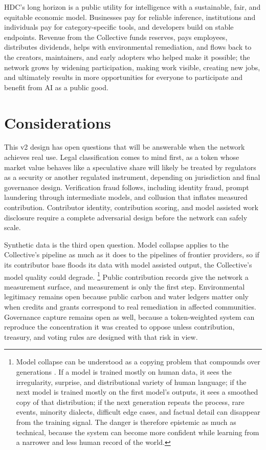 \documentclass[10pt,a4paper,twocolumn]{article}
\begin{document}
HDC's long horizon is a public utility for intelligence with a sustainable, fair, and equitable economic model. Businesses pay for reliable inference, institutions and individuals pay for category-specific tools, and developers build on stable endpoints. Revenue from the Collective funds reserves, pays employees, distributes dividends, helps with environmental remediation, and flows back to the creators, maintainers, and early adopters who helped make it possible; the network grows by widening participation, making work visible, creating new jobs, and ultimately results in more opportunities for everyone to participate and benefit from AI as a public good.

\section{Considerations}
\label{sec:considerations}

This v2 design has open questions that will be answerable when the network achieves real use. Legal classification comes to mind first, as a token whose market value behaves like a speculative share will likely be treated by regulators as a security or another regulated instrument, depending on jurisdiction and final governance design. Verification fraud follows, including identity fraud, prompt laundering through intermediate models, and collusion that inflates measured contribution. Contributor identity, contribution scoring, and model assisted work disclosure require a complete adversarial design before the network can safely scale.

Synthetic data is the third open question. Model collapse applies to the Collective's pipeline as much as it does to the pipelines of frontier providers, so if its contributor base floods its data with model assisted output, the Collective's model quality could degrade. \footnote{Model collapse can be understood as a copying problem that compounds over generations \citep{shumailov2024modelcollapse}. If a model is trained mostly on human data, it sees the irregularity, surprise, and distributional variety of human language; if the next model is trained mostly on the first model's outputs, it sees a smoothed copy of that distribution; if the next generation repeats the process, rare events, minority dialects, difficult edge cases, and factual detail can disappear from the training signal. The danger is therefore epistemic as much as technical, because the system can become more confident while learning from a narrower and less human record of the world.} Public contribution records give the network a measurement surface, and measurement is only the first step. Environmental legitimacy remains open because public carbon and water ledgers matter only when credits and grants correspond to real remediation in affected communities. Governance capture remains open as well, because a token-weighted system can reproduce the concentration it was created to oppose unless contribution, treasury, and voting rules are designed with that risk in view.
\end{document}
